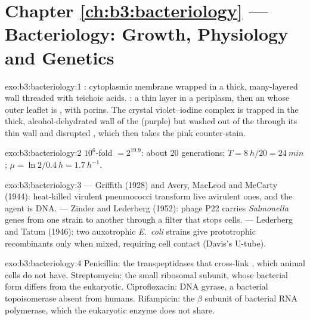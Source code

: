 \section*{Chapter \ref{ch:b3:bacteriology} --- Bacteriology: Growth, Physiology and Genetics}

\begin{solution}{exo:b3:bacteriology:1}
: cytoplasmic membrane wrapped in a thick, many-layered
 wall threaded with teichoic acids. : a thin
 layer in a periplasm, then an  whose outer
leaflet is , with porins. The crystal violet--iodine
complex is trapped in the thick, alcohol-dehydrated wall of the
 (purple) but washed out of the  through its
thin wall and disrupted , which then takes the pink
counter-stain.
\end{solution}

\begin{solution}{exo:b3:bacteriology:2}
$10^{6}$-fold $= 2^{19.9}$: about $20$ generations; $T = \qty{8}{h}/20
= \qty{24}{min}$; $\mu = \ln 2/\qty{0.4}{h} = \qty{1.7}{h^{-1}}$.
\end{solution}

\begin{solution}{exo:b3:bacteriology:3}
 --- Griffith (1928) and Avery, MacLeod and McCarty
(1944): heat-killed virulent pneumococci transform live avirulent
ones, and the agent is DNA.  --- Zinder and Lederberg
(1952): phage P22 carries \emph{Salmonella} genes from one strain to
another through a filter that stops cells.  --- Lederberg
and Tatum (1946): two auxotrophic \emph{E.~coli} strains give
prototrophic recombinants only when mixed, requiring cell contact
(Davis's U-tube).
\end{solution}

\begin{solution}{exo:b3:bacteriology:4}
Penicillin: the transpeptidases that cross-link , which
animal cells do not have. Streptomycin: the small ribosomal subunit,
whose bacterial form differs from the eukaryotic. Ciprofloxacin: DNA
gyrase, a bacterial topoisomerase absent from humans. Rifampicin: the
$\beta$ subunit of bacterial RNA polymerase, which the eukaryotic
enzyme does not share.
\end{solution}

